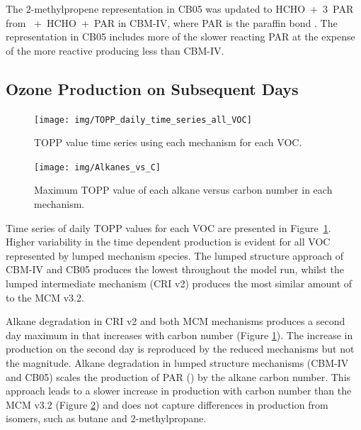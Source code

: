 The $2$-methylpropene representation in CB05 was updated to \mbox{HCHO + $3$ PAR} from \mbox{ + HCHO + PAR} in CBM-IV, where PAR is the paraffin  bond \citep{Gery:1989, Yarwood:2005}.
The representation in CB05 includes more of the slower reacting PAR at the expense of the more reactive  producing less  than CBM-IV.

\subsection{Ozone Production on Subsequent Days} \label{ss:profiles} %

\begin{figure}
    \centering
    \texttt{[image: img/TOPP\_daily\_time\_series\_all\_VOC]}
    \vspace{0mm}
    \caption{TOPP value time series using each mechanism for each VOC.}
    \vspace{-4mm}
    \label{f:TOPP_dailies}
\end{figure}

\begin{figure}
    \centering
    \texttt{[image: img/Alkanes\_vs\_C]}
    \vspace{0mm}
    \caption{Maximum TOPP value of each alkane versus carbon number in each mechanism.}
    \vspace{-4mm}
    \label{f:alkane_TOPP_C}
\end{figure}

Time series of daily TOPP values for each VOC are presented in \mbox{Figure \ref{f:TOPP_dailies}}. 
Higher variability in the time dependent  production is evident for all VOC represented by lumped mechanism species.
The lumped structure approach of CBM-IV and CB05 produces the lowest  throughout the model run, whilst the lumped intermediate mechanism (CRI v2) produces the most similar amount of  to the MCM v3.2.

Alkane degradation in CRI v2 and both MCM mechanisms produces a second day maximum in  that increases with carbon number (Figure \ref{f:TOPP_dailies}).
The increase in  production on the second day is reproduced by the reduced mechanisms but not the magnitude.
Alkane degradation in lumped structure mechanisms (CBM-IV and CB05) scales the  production of PAR () by the alkane carbon number.
This approach leads to a slower increase in  production with carbon number than the MCM v3.2 (Figure \ref{f:alkane_TOPP_C}) and does not capture differences in  production from isomers, such as butane and $2$-methylpropane.

